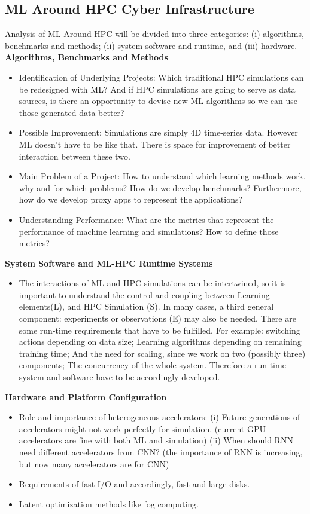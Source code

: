 \documentclass[conference]{IEEEtran}
\begin{document}
\subsection{ML Around HPC Cyber Infrastructure}
Analysis of ML Around HPC will be divided into three categories: (i) algorithms, benchmarks and methods; (ii) system software and runtime, and (iii) hardware.\\
\textbf{Algorithms, Benchmarks and Methods}
\begin{itemize}
\item Identification of Underlying Projects: Which traditional HPC simulations can be redesigned with ML? And if HPC simulations are going to serve as data sources, is there an opportunity to devise new ML algorithms so we can use those generated data better?
\item Possible Improvement: Simulations are simply 4D time-series data. However ML doesn't have to be like that. There is space for improvement of better interaction between these two.
\item Main Problem of a Project: How to understand which learning methods work. why and for which problems? How do we develop benchmarks? Furthermore, how do we develop proxy apps to represent the applications?
\item Understanding Performance: What are the metrics that represent the performance of machine learning and simulations? How to define those metrics?
\end{itemize}
\textbf{System Software and ML-HPC Runtime Systems}
\begin{itemize}
\item The interactions of ML and HPC simulations can be intertwined, so it is important to understand the control and coupling between Learning elements(L), and HPC Simulation (S). In many cases, a third general component: experiments or observations (E) may also be needed.
There are some run-time requirements that have to be fulfilled. For example: switching actions depending on data size; Learning algorithms depending on remaining training time; And the need for scaling, since we work on two (possibly three) components; The concurrency of the whole system. Therefore a run-time system and software have to be accordingly developed.
\end{itemize}
\textbf{Hardware and Platform Configuration}
\begin{itemize}
\item Role and importance of heterogeneous accelerators: (i) Future generations of accelerators might not work perfectly for simulation. (current GPU accelerators are fine with both ML and simulation) (ii) When should RNN need different accelerators from CNN? (the importance of RNN is increasing, but now many accelerators are for CNN)
\item Requirements of fast I/O and accordingly, fast and large disks.
\item Latent optimization methods like fog computing.
\end{itemize}
\end{document}
